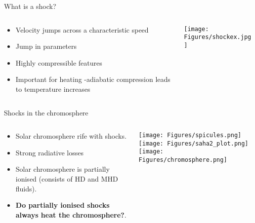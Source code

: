 \documentclass[10pt,aspectratio=169,usenames,dvipsnames]{beamer}
\begin{document}
\begin{frame}{What is a shock?}
\begin{columns}
\begin{column}{0.3\textwidth}
\begin{itemize}
    \item Velocity jumps across a characteristic speed
    \item Jump in parameters
    \item Highly compressible features
    \item Important for heating -adiabatic compression leads to temperature increases
\end{itemize}
\end{column}
\begin{column}{0.7\textwidth}
\texttt{[image: Figures/shockex.jpg]}
\end{column}
\end{columns}
\end{frame}

\begin{frame}{Shocks in the chromosphere}
\begin{columns}
\begin{column}{0.3\textwidth}
\begin{itemize}
    \item Solar chromosphere rife with shocks.
    \item Strong radiative losses 
    \item Solar chromosphere is partially ionised (consists of HD and MHD fluids).
    \item \textbf{Do partially ionised shocks always heat the chromosphere?}.
\end{itemize}
\end{column}
\begin{column}{0.7\textwidth}
\texttt{[image: Figures/spicules.png]}
\texttt{[image: Figures/saha2\_plot.png]}\\
\texttt{[image: Figures/chromosphere.png]}
\end{column}
\end{columns}
\end{frame}
\end{document}
